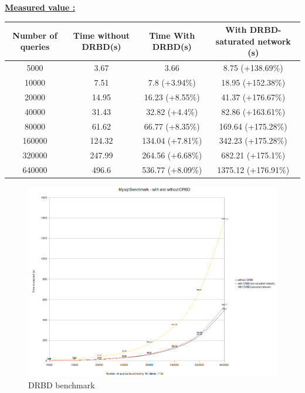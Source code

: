 \documentclass[a4paper,10pt]{report}
\begin{document}
\bigskip 

\underline{\textbf{Measured value :}}\\

\begin{tabular}{|c|c|c|c|}
\hline
Number of queries&Time without DRBD(s)&Time With DRBD(s)&With DRBD-saturated network (s)\\
\hline
5000 & 3.67 & 3.66 & 8.75 (+138.69\%)\\
\hline
10000 & 7.51 & 7.8 (+3.94\%)& 18.95 (+152.38\%)\\
\hline
20000 & 14.95 & 16.23 (+8.55\%)& 41.37 (+176.67\%)\\
\hline
40000 & 31.43 & 32.82 (+4.4\%) & 82.86 (+163.61\%)\\
\hline
80000 & 61.62 & 66.77 (+8.35\%)& 169.64 (+175.28\%)\\
\hline
160000 & 124.32 & 134.04 (+7.81\%)& 342.23 (+175.28\%)\\
\hline
320000 & 247.99 & 264.56 (+6.68\%)& 682.21 (+175.1\%)\\
\hline
640000 & 496.6 & 536.77 (+8.09\%)& 1375.12 (+176.91\%)\\
\hline
\end{tabular}




\begin{figure}[H]
\begin{center}
\includegraphics[scale=0.5]{schema/drbd-test.png}
\end{center}
\caption{DRBD benchmark} 
\label{hb-gui-2nodes} 
\end{figure}
\end{document}

